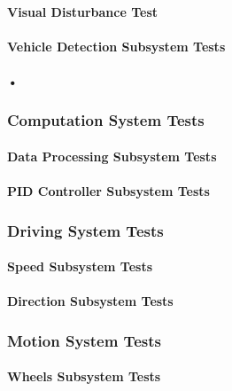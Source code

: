 \documentclass[a4paper,12pt]{article}
\begin{document}
		\paragraph{Visual Disturbance Test}
		
		\paragraph{}
	 
	 
	\paragraph{Vehicle Detection Subsystem Tests}
	
		\paragraph{•}
	\subsubsection{Computation System Tests}
	
	\paragraph{Data Processing Subsystem Tests}	
		
	\paragraph{PID Controller Subsystem Tests}
	
	
	\subsubsection{Driving System Tests}
	
	\paragraph{Speed Subsystem Tests}	
		
	\paragraph{Direction Subsystem Tests}


	\subsubsection{Motion System Tests}
	
	\paragraph{Wheels Subsystem Tests}	
		
\end{document}
